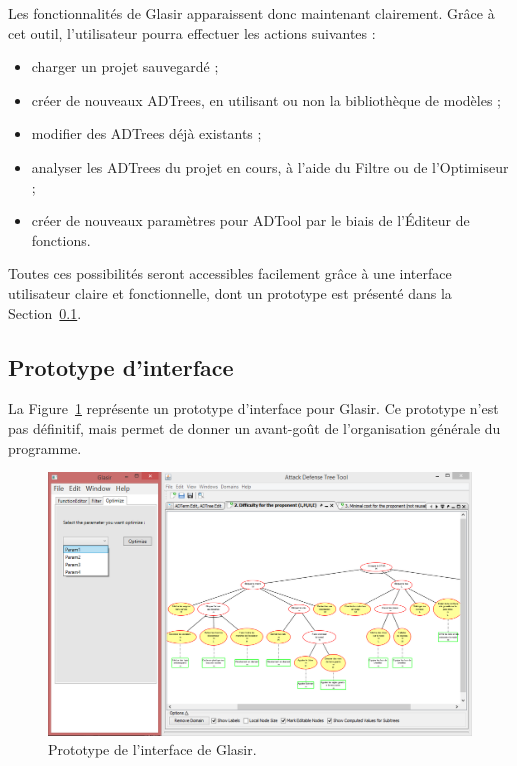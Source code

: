     Les fonctionnalités de Glasir apparaissent donc maintenant clairement. Grâce à cet outil, l'utilisateur pourra effectuer les actions suivantes : 

    \begin{itemize}
    \item charger un projet sauvegardé ;
    \item créer de nouveaux ADTrees, en utilisant ou non la bibliothèque de modèles ;
    \item modifier des ADTrees déjà existants ;
    \item analyser les ADTrees du projet en cours, à l'aide du Filtre ou de l'Optimiseur ;
    \item créer de nouveaux paramètres pour ADTool par le biais de l'Éditeur de fonctions.
    \end{itemize}  

    Toutes ces possibilités seront accessibles facilement grâce à une interface utilisateur claire et fonctionnelle, dont un prototype est présenté dans la {\sc Section}~\ref{sec:interface}.      
    
    \subsection{Prototype d'interface}
    \label{sec:interface}
    
    La {\sc Figure}~\ref{fig:interface} représente un prototype d'interface pour Glasir. Ce prototype n'est pas définitif, mais permet de donner un avant-goût de l'organisation générale du programme. 

    \begin{figure}[h!]
        \centering
        \hspace*{-1.9cm}
        \includegraphics[width=1.25\textwidth]{figure/interface.png}
        \caption{Prototype de l'interface de Glasir.}
        \label{fig:interface}
    \end{figure}
    

